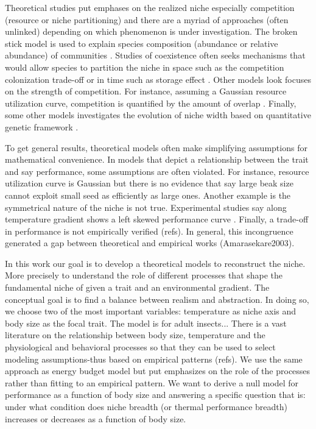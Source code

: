 Theoretical studies put emphases on the realized niche especially competition (resource or niche partitioning) and there are a myriad of approaches (often unlinked) depending on which phenomenon is under investigation.  
The broken stick model is used to explain species composition (abundance or relative abundance) of communities \citep{MacArthur1957} .
Studies of coexistence often seeks mechanisms that would allow species to partition the niche in space such as the competition colonization trade-off \citep[e.g.,][]{Levins1971,Tilman1994} or in time such as storage effect \citep{Skellam1951, Chesson2000}.
Other models look focuses on the strength of competition.
For instance, assuming a Gaussian resource utilization curve, competition is quantified by the amount of overlap \citep{MacArthur1967, Roughgarden1979}.%
Finally, some other models investigates the evolution of niche width based on quantitative genetic framework \citep[reviewed in]{Futuyama1988}.

To get general results, theoretical models often make simplifying assumptions for mathematical convenience.
In models that depict a relationship between the trait and say performance, some assumptions are often violated.
For instance, resource utilization curve is Gaussian but there is no evidence that say large beak size cannot exploit small seed as efficiently as large ones.
Another example is the symmetrical nature of the niche is not true.
Experimental studies say along temperature gradient shows a left skewed performance curve \citep{Angilletta2009}.
Finally, a trade-off in performance is not empirically verified (refs).%
In general, this incongruence generated a gap between theoretical and empirical works (Amarasekare2003).

In this work our goal is to develop a theoretical models to reconstruct the niche.
More precisely to understand the role of different processes that shape the fundamental niche of given a trait and an environmental gradient.
The conceptual goal is to find a balance between realism and abstraction.
In doing so, we choose two of the most important variables: temperature as niche axis and body size as the focal trait.
The model is for adult insects...%
There is a vast literature on the relationship between body size, temperature and the physiological and behavioral processes so that they can be used to select modeling assumptions-thus based on empirical patterns (refs).
We use the same approach as energy budget model but put emphasizes on the role of the processes rather than fitting to an empirical pattern.
We want to derive a null model for performance as a function of body size and answering a specific question that is: under what condition does niche breadth (or thermal performance breadth) increases or decreases as a function of body size.


